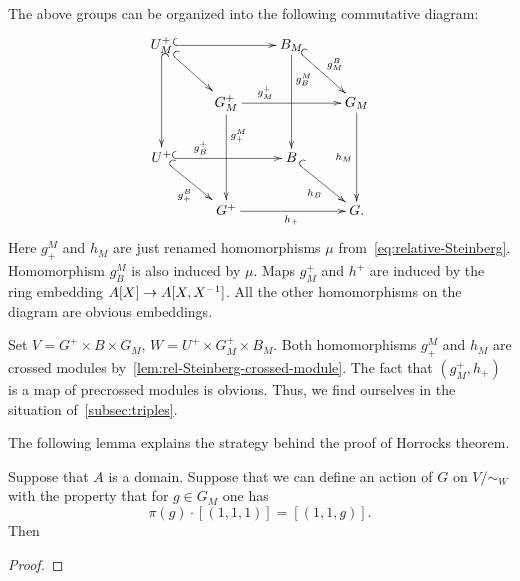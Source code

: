 The above groups can be organized into the following commutative diagram:
\begin{equation} \label{eq:cube-Steinberg} \xymatrix{
    U^+_M \ar@{^{(}->}[rr] \ar@{^{(}->}[dd] \ar@{^{(}->}[rd] &                        & B_M \ar[dd]^(.3){g_B^M} \ar@{^{(}->}[rd]^{g^B_M} &           \\
    & G^+_M \ar[rr]^(.3){g^+_M} \ar^(.3){g^M_+}[dd] &                   & G_M \ar[dd]_{h_M} \\
    U^+ \ar@{^{(}->}[rr]^(.3){g_B^+} \ar@{^{(}->}[rd]_{g_+^B}          &                        & B \ar@{^{(}->}[rd]_{h_B}       &           \\
    & G^+ \ar[rr]_{h_+}              &                   & G.}\end{equation}
Here $g^M_+$ and $h_M$ are just renamed homomorphisms $\mu$ from~\eqref{eq:relative-Steinberg}.
Homomorphism $g^M_B$ is also induced by $\mu$.
Maps $g_M^+$ and $h^+$ are induced by the ring embedding $A[X] \to A[X, X^{-1}]$.
All the other homomorphisms on the diagram are obvious embeddings.

Set $V = G^+\times B \times G_M$, $W = U^+\times G^+_M \times B_M$.
Both homomorphisms $g_+^M$ and $h_M$ are crossed modules by~\cref{lem:rel-Steinberg-crossed-module}.
The fact that $(g^+_M, h_+)$ is a map of precrossed modules is obvious.
Thus, we find ourselves in the situation of~\cref{subsec:triples}.

The following lemma explains the strategy behind the proof of Horrocks theorem.
\begin{lemma}
    Suppose that $A$ is a domain.
    Suppose that we can define an action of $G$ on $V/\sim_W$ with the property that
      for $g \in G_M$ one has \[ \pi(g) \cdot [(1, 1, 1)] = [(1, 1, g)]. \]
    Then
\end{lemma}
\begin{proof}

\end{proof}